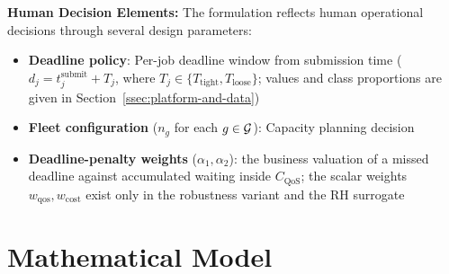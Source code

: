 \textbf{Human Decision Elements:} The formulation reflects human operational decisions through several design parameters:
\begin{itemize}
\item \textbf{Deadline policy}: Per-job deadline window from submission time ($d_j = t_j^{\text{submit}} + T_j$, where $T_j \in \{T_{\text{tight}}, T_{\text{loose}}\}$; values and class proportions are given in Section~\ref{ssec:platform-and-data})
\item \textbf{Fleet configuration} ($n_g$ for each $g \in \mathcal{G}$): Capacity planning decision
\item \textbf{Deadline-penalty weights} ($\alpha_1, \alpha_2$): the business valuation of a missed deadline against accumulated waiting inside $C_{\text{QoS}}$; the scalar weights $w_{\text{qos}}, w_{\text{cost}}$ exist only in the robustness variant and the RH surrogate
\end{itemize}

\section{Mathematical Model}
\label{sec:mathematical-model}

